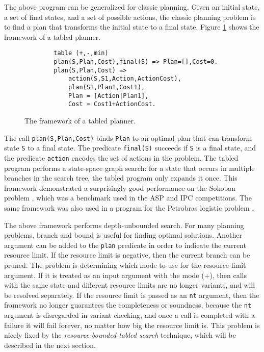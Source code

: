 \documentclass{new_tlp}
\begin{document}
The above program can be generalized for classic planning. Given an initial state, a set of final states, and a set of possible actions, the classic planning problem is to find a plan that transforms the initial state to a final state. Figure \ref{fig:plan} shows the framework of a tabled planner.

\begin{figure}[tb]
\begin{center}
\begin{verbatim}
        table (+,-,min)
        plan(S,Plan,Cost),final(S) => Plan=[],Cost=0.
        plan(S,Plan,Cost) =>
            action(S,S1,Action,ActionCost),
            plan(S1,Plan1,Cost1),
            Plan = [Action|Plan1],
            Cost = Cost1+ActionCost.
\end{verbatim}
\end{center}
\caption{\label{fig:plan}The framework of a tabled planner.}
\end{figure}

The call {\tt plan(S,Plan,Cost)} binds {\tt Plan} to an optimal plan that can transform state {\tt S} to a final state. The predicate {\tt final(S)} succeeds if {\tt S} is a final state, and the predicate {\tt action} encodes the set of actions in the problem. The tabled program performs a state-space graph search: for a state that occurs in multiple branches in the search tree, the tabled program only expands it once. This framework demonstrated a surprisingly good performance on the Sokoban problem \cite{ZhouD13}, which was a benchmark used in the ASP and IPC competitions. The same framework was also used in a program for the Petrobras logistic problem \cite{BartakZ14}.

The above framework performs depth-unbounded search. For many planning problems, branch and bound is useful for finding optimal solutions. Another argument can be added to the {\tt plan} predicate in order to indicate the current resource limit. If the resource limit is negative, then the current branch can be pruned. The problem is determining which mode to use for the resource-limit argument. If it is treated as an input argument with the mode (+), then calls with the same state and different resource limits are no longer variants, and will be resolved separately. If the resource limit is passed as an {\tt nt} argument, then the framework no longer guarantees the completeness or soundness, because the {\tt nt} argument is disregarded in variant checking, and once a call is completed with a failure it will fail forever, no matter how big the resource limit is. This problem is nicely fixed by the {\it resource-bounded tabled search} technique, which will be described in the next section.
\end{document}
